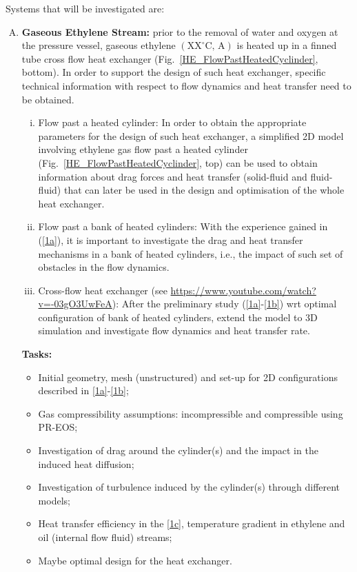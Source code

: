 \documentclass[12pts,a4paper,amsmath,amssymb,floatfix]{article}%
\begin{document}
Systems that will be investigated are:
\begin{enumerate}[A.]
  \item {\bf Gaseous Ethylene Stream:} prior to the removal of water and oxygen at the pressure vessel, gaseous ethylene $\left(\text{XX}^{\circ}\text{C, A}\right)$ is heated up in a finned tube cross flow heat exchanger (Fig.~\ref{HE_FlowPastHeatedCyclinder}, bottom). In order to support the design of such heat exchanger, specific technical information with respect to flow dynamics and heat transfer need to be obtained.
     \begin{enumerate}[i)]
        \item\label{1a} Flow past a heated cylinder: In order to obtain the appropriate parameters for the design of such heat exchanger, a simplified 2D model involving ethylene gas flow past a heated cylinder (Fig.~\ref{HE_FlowPastHeatedCyclinder}, top) can be used to obtain information about drag forces and heat transfer (solid-fluid and fluid-fluid) that can later be used in the design and optimisation of the whole heat exchanger. 
        \item\label{1b} Flow past a bank of heated cylinders: With the experience gained in (\ref{1a}), it is important to investigate the drag and heat transfer mechanisms in a bank of heated cylinders, i.e., the impact of such set of obstacles in the flow dynamics.
        \item\label{1c} Cross-flow heat exchanger (see \href{https://www.youtube.com/watch?v=-03gO3UwFeA}{https://www.youtube.com/watch?v=-03gO3UwFeA}): After the preliminary study (\ref{1a}-\ref{1b}) wrt optimal configuration of bank of heated cylinders, extend the model to 3D simulation and investigate flow dynamics and heat transfer rate.
     \end{enumerate}

     {\bf Tasks:}
     \begin{itemize}
        \item Initial geometry, mesh (unstructured) and set-up for 2D configurations described in \ref{1a}-\ref{1b};
        \item Gas compressibility assumptions: incompressible and compressible using PR-EOS;
        \item Investigation of drag around the cylinder(s) and the impact in the induced heat diffusion;
        \item Investigation of turbulence induced by the cylinder(s) through different models;
        \item Heat transfer efficiency in the \ref{1c}, temperature gradient in ethylene and oil (internal flow fluid) streams;
        \item Maybe optimal design for the heat exchanger.
     \end{itemize}


\end{enumerate}
\end{document}
